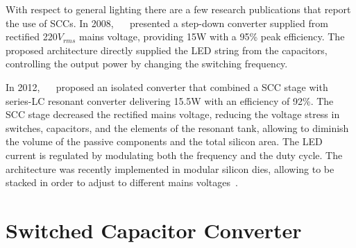 With respect to general lighting there are a few research publications that report the use of SCCs. In 2008, ~\citeauthor{08Lee}~\cite{08Lee} presented a step-down converter supplied from rectified 220$V_{rms}$ mains voltage, providing 15W with a 95\% peak efficiency. The proposed architecture directly supplied the LED string from the capacitors, controlling the output power by changing the switching frequency.

In 2012, ~\citeauthor{2012Kline}~\cite{2012Kline} proposed an isolated converter that combined a SCC stage with series-LC resonant converter delivering 15.5W with an efficiency of  92\%.  The SCC stage decreased  the rectified mains voltage, reducing the voltage stress in switches, capacitors, and the elements of the resonant tank, allowing to diminish  the volume of the passive components and the total silicon area. The LED current is regulated by modulating both the frequency and the duty cycle.  The architecture was recently implemented in modular silicon dies, allowing to be stacked in order to adjust to different mains voltages~\cite{2013Kline}.



\section{Switched Capacitor Converter}


